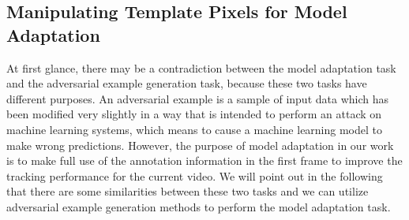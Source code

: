 \documentclass[journal]{IEEEtran}
\begin{document}
\subsection{Manipulating Template Pixels for Model Adaptation}
At first glance, there may be a contradiction between the model adaptation task and the adversarial example generation task, because these two tasks have different purposes. An adversarial example \cite{kurakin2017adversarial} is a sample of input data which has been modified very slightly in a way that is intended to perform an attack on machine learning systems, which means to cause a machine learning model to make wrong predictions. However, the purpose of model adaptation in our work is to make full use of the annotation information in the first frame to improve the tracking performance for the current video. We will point out in the following that there are some similarities between these two tasks and we can utilize adversarial example generation methods to perform the model adaptation task.
\end{document}
